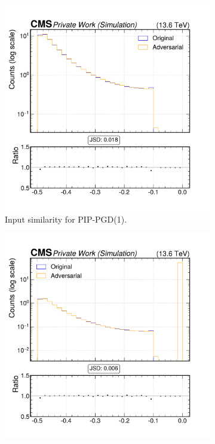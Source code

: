 \begin{figure}[htbp]
  \centering
  \begin{subfigure}[t]{0.32\textwidth}
    \includegraphics[width=\linewidth]{media/output/features/compare/combined_it_1/cmp_vtx_arr_sv_deltaR.pdf}
    \caption*{Input similarity for PIP-PGD(1).}
  \end{subfigure}\hfill
  \begin{subfigure}[t]{0.32\textwidth}
    \includegraphics[width=\linewidth]{media/output/features/compare/combined_it_2/cmp_vtx_arr_sv_deltaR.pdf}

\end{subfigure}
\end{figure}
